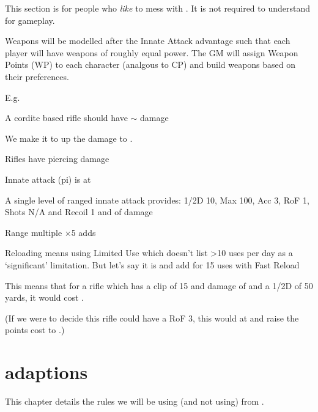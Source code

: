 \begin{tcolorbox}[title={Warning}]
  This section is for people who \emph{like} to mess with \gurps. It is not
  required to understand for gameplay.
\end{tcolorbox}

Weapons will be modelled after the Innate Attack advantage such that each player
will have weapons of roughly equal power. The GM will assign Weapon Points (WP)
to each character (analgous to CP) and build weapons based on their preferences.

E.g.

\begin{innateattack}
  \item A cordite based rifle should have \(\sim\) damage
  \item We make it  to up the damage to .
  \item Rifles have piercing damage
  \item Innate attack (pi) is at 
  \item A single level of ranged innate attack provides: 1/2D 10, Max 100, Acc
    3, RoF 1, Shots N/A and Recoil 1 and  of damage
  \item Range multiple ×5 adds 
  \item Reloading means using Limited Use which doesn't list >10 uses per day as
    a `significant' limitation. But let's say it is and add
    for 15 uses with Fast Reload
  \item This means that for a rifle which has a clip of 15 and damage of
     and a 1/2D of 50 yards, it would cost
    \InnateAttackTotalPoints.
  \item (If we were to decide this rifle could have a RoF 3, this would at
     and raise the points cost to
    \InnateAttackTotalPoints.)
\end{innateattack}

\begin{center}
  \InnateAttackBreakdown
\end{center}
\chapter{\gurps adaptions}
\label{cha:gurps-adaptions}

This chapter details the rules we will be using (and not using) from \gurps.

